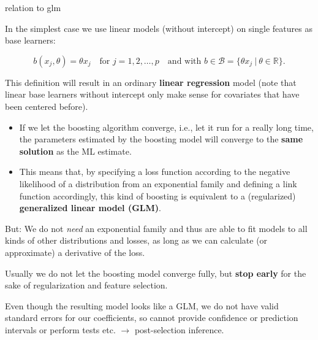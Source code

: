 
\begin{vbframe}{relation to glm}

In the simplest case we use linear models (without intercept) on single features 
as base learners:

$$
  b(x_j,\theta) = \theta x_j  \quad \text{for } j = 1, 2, \dots, p \quad
  \text{and with } b \in \mathcal{B} = \{\theta x_j  ~\rvert~ \theta \in 
  \mathbb{R} \}.
$$


This definition will result in an ordinary \textbf{linear regression} model 
(note that linear base learners without intercept only make sense for covariates 
that have been centered before).



\begin{itemize}
  \item If we let the boosting algorithm converge, i.e., let it run for a really 
  long time, the parameters estimated by the boosting model will converge to the 
  \textbf{same solution} as the ML estimate.
  \item This means that, by specifying a loss function according to the negative 
  likelihood of a distribution from an exponential family and defining a link 
  function accordingly, this kind of boosting is equivalent to a (regularized)
  \textbf{generalized linear model (GLM)}.
\end{itemize}

\framebreak


But: We do not \emph{need} an exponential family and thus are able to fit models 
to all kinds of other distributions and losses, as long as we can calculate (or 
approximate) a derivative of the loss. 

\lz

Usually we do not let the boosting model converge fully, but \textbf{stop 
early} for the sake of regularization and feature selection.

\lz

Even though the resulting model looks like a GLM, we do not have valid standard 
errors for our coefficients,
so cannot provide confidence or prediction intervals or perform tests etc.
$\rightarrow$ post-selection inference.

\end{vbframe}

